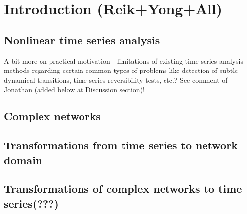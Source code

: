 \section{Introduction {\bf{(Reik+Yong+All)}}}

\subsection{Nonlinear time series analysis}

A bit more on practical motivation - limitations of existing time series
analysis methods regarding certain common types of problems like detection of
subtle dynamical transitions, time-series reversibility tests, etc.? See comment
of Jonathan (added below at Discussion section)!

\subsection{Complex networks}

\subsection{Transformations from time series to network domain}
\cite{Donner2010NJP,marwan2007}

\subsection{Transformations of complex networks to time series(???)}
